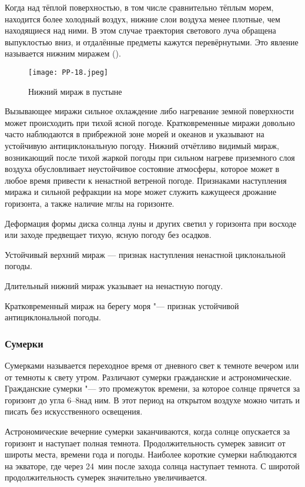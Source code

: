 Когда над тёплой поверхностью, в том числе сравнительно тёплым морем,
находится более холодный воздух, нижние слои воздуха менее плотные,
чем находящиеся над ними. В этом случае траектория светового луча
обращена выпуклостью вниз, и отдалённые предметы кажутся
перевёрнутыми. Это явление называется нижним миражем ().

\begin{figure}[htb]
  \centering{}
  \texttt{[image: PP-18.jpeg]}
  \caption{Нижний мираж в пустыне}
  \label{fig:pp18}
  \small
  \centering{}
\end{figure}

Вызывающее миражи сильное охлаждение либо нагревание земной
поверхности может происходить при тихой ясной погоде. Кратковременные
миражи довольно часто наблюдаются в прибрежной зоне морей и океанов и
указывают на устойчивую антициклональную погоду. Нижний отчётливо
видимый мираж, возникающий после тихой жаркой погоды при сильном
нагреве приземного слоя воздуха обусловливает неустойчивое состояние
атмосферы, которое может в любое время привести к ненастной ветреной
погоде. Признаками наступления миража и сильной рефракции на море
может служить кажущееся дрожание горизонта, а также наличие мглы на
горизонте.

 Деформация формы диска солнца луны и других светил у горизонта
при восходе или заходе предвещает тихую, ясную погоду без осадков.

 Устойчивый верхний мираж — признак наступления ненастной
циклональной погоды.

 Длительный нижний мираж указывает на ненастную погоду.

 Кратковременный мираж на берегу моря "--- признак устойчивой
антициклональной погоды.

\subsubsection{Сумерки}

Сумерками называется переходное время от дневного свет к темноте
вечером или от темноты к свету утром. Различают сумерки гражданские и
астрономические. Гражданские сумерки "--- это промежуток времени, за
которое солнце прячется за горизонт до угла 6--8\gr над ним. В этот
период на открытом воздухе можно читать и писать без искусственного
освещения.

Астрономические вечерние сумерки заканчиваются, когда солнце
опускается за горизонт и наступает полная темнота. Продолжительность
сумерек зависит от широты места, времени года и погоды. Наиболее
короткие сумерки наблюдаются на экваторе, где через 24~мин после
захода солнца наступает темнота. С широтой продолжительность сумерек
значительно увеличивается.

